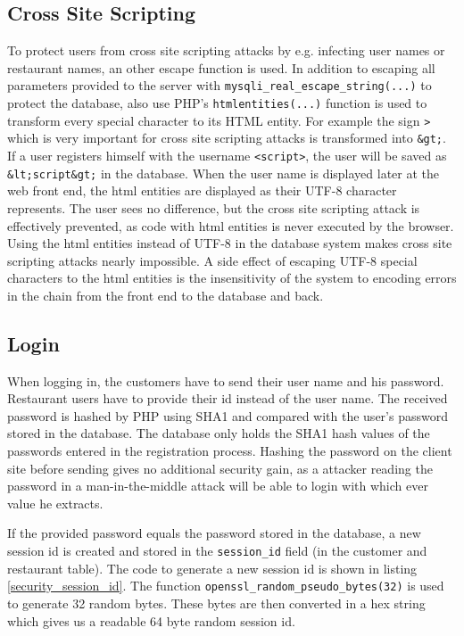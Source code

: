 \subsection{Cross Site Scripting}
To protect users from cross site scripting attacks by e.g. infecting user names or restaurant names, an other escape function is used. In addition to escaping all parameters provided to the server with \texttt{mysqli\_real\_escape\_string(...)} to protect the database, also use PHP's \texttt{htmlentities(...)} function is used to transform every special character to its HTML entity. For example the sign \texttt{>} which is very important for cross site scripting attacks is transformed into \texttt{\&gt;}. If a user registers himself with the username \texttt{<script>}, the user will be saved as \texttt{\&lt;script\&gt;} in the database. When the user name is displayed later at the web front end, the html entities are displayed as their UTF-8 character represents. The user sees no difference, but the cross site scripting attack is effectively prevented, as code with html entities is never executed by the browser. Using the html entities instead of UTF-8 in the database system makes cross site scripting attacks nearly impossible. A side effect of escaping UTF-8 special characters to the html entities is the insensitivity of the system to encoding errors in the chain from the front end to the database and back.

\subsection{Login}
When logging in, the customers have to send their user name and his password. Restaurant users have to provide their id instead of the user name. The received password is hashed by PHP using SHA1 and compared with the user's password stored in the database. The database only holds the SHA1 hash values of the passwords entered in the registration process. Hashing the password on the client site before sending gives no additional security gain, as a attacker reading the password in a man-in-the-middle attack will be able to login with which ever value he extracts.

If the provided password equals the password stored in the database, a new session id is created and stored in the \texttt{session\_id} field (in the customer and restaurant table). The code to generate a new session id is shown in listing \ref{security_session_id}. The function \texttt{openssl\_random\_pseudo\_bytes(32)} is used to generate 32 random bytes. These bytes are then converted in a hex string which gives us a readable 64 byte random session id.

